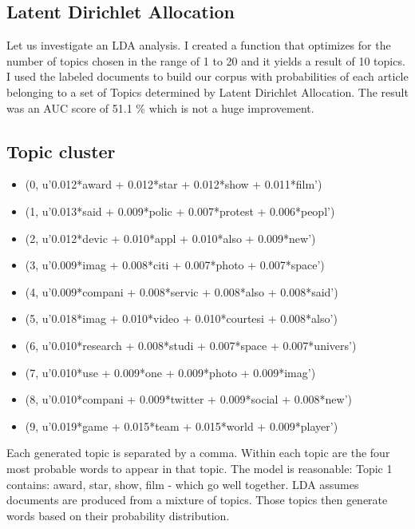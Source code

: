 \documentclass[twoside,twocolumn]{article}
\begin{document}
\subsection{Latent Dirichlet Allocation}
Let us investigate an LDA analysis. I created a function that optimizes for the number of topics chosen in the range of 1 to 20 and it yields a result of 10 topics. I used the labeled documents to build our corpus with probabilities of each article belonging to a set of Topics determined by Latent Dirichlet Allocation. The result was an AUC score of 51.1 \% which is not a huge improvement. 

\subsection{Topic cluster}
\begin{itemize}
\item (0, u'0.012*award + 0.012*star + 0.012*show + 0.011*film')
\item (1, u'0.013*said + 0.009*polic + 0.007*protest + 0.006*peopl')
\item (2, u'0.012*devic + 0.010*appl + 0.010*also + 0.009*new')
\item (3, u'0.009*imag + 0.008*citi + 0.007*photo + 0.007*space')
\item (4, u'0.009*compani + 0.008*servic + 0.008*also + 0.008*said')
\item (5, u'0.018*imag + 0.010*video + 0.010*courtesi + 0.008*also')
\item (6, u'0.010*research + 0.008*studi + 0.007*space + 0.007*univers')
\item (7, u'0.010*use + 0.009*one + 0.009*photo + 0.009*imag')
\item (8, u'0.010*compani + 0.009*twitter + 0.009*social + 0.008*new')
\item (9, u'0.019*game + 0.015*team + 0.015*world + 0.009*player')
\end{itemize}

Each generated topic is separated by a comma. Within each topic are the four most probable words to appear in that topic. The model is reasonable: Topic 1 contains: award, star, show, film - which go well together. LDA assumes documents are produced from a mixture of topics. Those topics then generate words based on their probability distribution.

\end{document}
